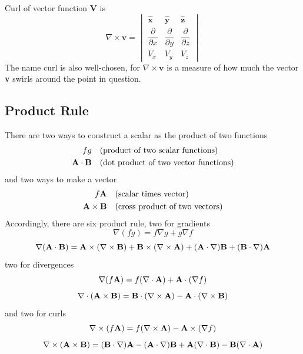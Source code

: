 \documentclass[../main.tex]{subfiles}
\begin{document}
Curl of vector function \textbf{V} is
\begin{equation*}
    \nabla \times  \mathbf{v}=
    \begin{vmatrix}
         \mathbf{\hat{x}}& \mathbf{\hat{y}}& \mathbf{\hat{z}}\\
        \dfrac{\partial }{\partial x}&\dfrac{\partial}{\partial y}&\dfrac{\partial }{\partial z}\\
        V_x&V_y&V_z
    \end{vmatrix} 
\end{equation*}
The name curl is also well-chosen, for $\nabla \times  \mathbf{v}$ is a measure of how much the vector \textbf{v} swirls around the point in question. 

\subsection*{Product Rule}
There are two ways to construct a scalar as the product of two functions
\begin{align*}
    fg\quad&\text{(product of two scalar functions)}\\
    \mathbf{A}\cdot \mathbf{B}\quad&\text{(dot product of two vector functions)}
\end{align*}
and two ways to make a vector
\begin{align*}
    f\mathbf{A}\quad&\text{(scalar times vector)}\\
    \mathbf{A}\times \mathbf{B}\quad&\text{(cross product of two vectors)}
\end{align*}
Accordingly, there are six product rule, two for gradients
\begin{equation*}
    \nabla ( f g) = f \nabla g + g\nabla f
\end{equation*}
\begin{equation*}
    \nabla(\mathbf{A} \cdot \mathbf{B}) = \mathbf{A} \times (\nabla \times  \mathbf{B}) + \mathbf{B} \times  (\nabla \times  \mathbf{A}) + (\mathbf{A} \cdot \nabla)\mathbf{B} + (\mathbf{B} \cdot \nabla)\mathbf{A}
\end{equation*}
two for divergences
\begin{equation*}
    \nabla ( f \mathbf{A}) = f (\nabla \cdot \mathbf{A}) + \mathbf{A}\cdot(\nabla f)
\end{equation*}
\begin{equation*}
    \nabla\cdot (\mathbf{A} \times \mathbf{B}) = \mathbf{B}\cdot (\nabla \times  \mathbf{A})-\mathbf{A}\cdot (\nabla \times \mathbf{B})
\end{equation*}
and two for curls
\begin{equation*}
    \nabla \times ( f \mathbf{A}) = f (\nabla \times \mathbf{A}) - \mathbf{A} \times (\nabla f )
\end{equation*}
\begin{equation*}
    \nabla \times (\mathbf{A} \times \mathbf{B}) = (\mathbf{B} \cdot \nabla)\mathbf{A} - (\mathbf{A} \cdot \nabla)\mathbf{B} + \mathbf{A}(\nabla \cdot \mathbf{B}) - \mathbf{B}(\nabla \cdot \mathbf{A})
\end{equation*}
\end{document}
